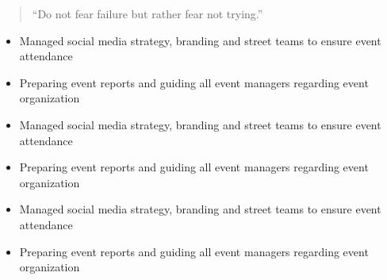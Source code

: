 \begin{quote}
``Do not fear failure but rather fear not trying.''
\end{quote}









 
\begin{itemize}
\item Managed social media strategy, branding and street teams to ensure event attendance
\item Preparing event reports and guiding all event managers regarding event organization
\end{itemize}

\divider

 
\begin{itemize}
\item Managed social media strategy, branding and street teams to ensure event attendance
\item Preparing event reports and guiding all event managers regarding event organization
\end{itemize}

\divider

 
\begin{itemize}
\item Managed social media strategy, branding and street teams to ensure event attendance
\item Preparing event reports and guiding all event managers regarding event organization
\end{itemize}

